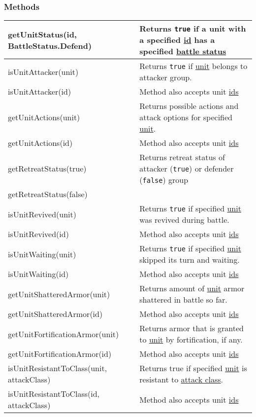 \subsubsection{Methods}
\begin{center}
\begin{tabularx}{\linewidth}{| l | X |}
\hline
getUnitStatus(id, BattleStatus.Defend) & Returns \texttt{true} if a unit with a specified \hyperref[Id]{id} has a specified \hyperref[BattleStatus]{battle status}\\
\hline
isUnitAttacker(unit) & Returns \texttt{true} if \hyperref[Unit]{unit} belongs to attacker group.\\
isUnitAttacker(id) & Method also accepts unit \hyperref[Id]{ids}\\
\hline
getUnitActions(unit) & Returns possible actions and attack options for specified \hyperref[Unit]{unit}.\\
getUnitActions(id) & Method also accepts unit \hyperref[Id]{ids}\\
\hline
getRetreatStatus(true) & Returns retreat status of attacker (\texttt{true}) or defender (\texttt{false}) group\\
getRetreatStatus(false) &\\
\hline
isUnitRevived(unit) & Returns \texttt{true} if specified \hyperref[Unit]{unit} was revived during battle.\\
isUnitRevived(id) & Method also accepts unit \hyperref[Id]{ids}\\
\hline
isUnitWaiting(unit) & Returns \texttt{true} if specified \hyperref[Unit]{unit} skipped its turn and waiting.\\
isUnitWaiting(id) & Method also accepts unit \hyperref[Id]{ids}\\
\hline
getUnitShatteredArmor(unit) & Returns amount of \hyperref[Unit]{unit} armor shattered in battle so far.\\
getUnitShatteredArmor(id) & Method also accepts unit \hyperref[Id]{ids}\\
\hline
getUnitFortificationArmor(unit) & Returns armor that is granted to \hyperref[Unit]{unit} by fortification, if any.\\
getUnitFortificationArmor(id) & Method also accepts unit \hyperref[Id]{ids}\\
\hline
isUnitResistantToClass(unit, attackClass) & Returns true if specified \hyperref[Unit]{unit} is resistant to \hyperref[AttackCategory]{attack class}.\\
isUnitResistantToClass(id, attackClass) & Method also accepts unit \hyperref[Id]{ids}\\

\end{tabularx}
\end{center}
